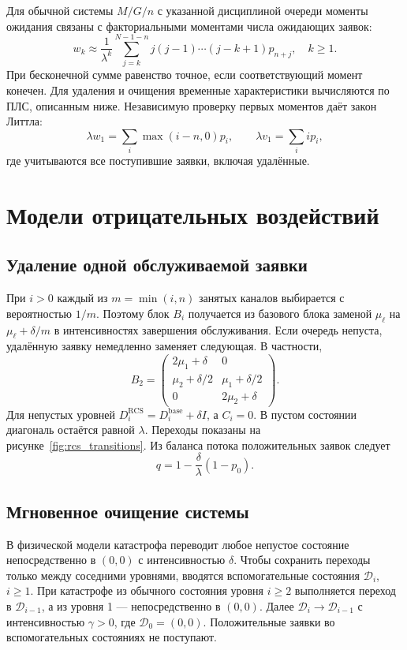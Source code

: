 Для обычной системы \(M/G/n\) с указанной дисциплиной очереди моменты ожидания связаны с факториальными моментами числа ожидающих заявок:
\[
w_k\approx\frac{1}{\lambda^k}\sum_{j=k}^{N-1-n}j(j-1)\cdots(j-k+1)p_{n+j},\quad k\ge1.
\]
При бесконечной сумме равенство точное, если соответствующий момент конечен. Для удаления и очищения временные характеристики вычисляются по ПЛС, описанным ниже. Независимую проверку первых моментов даёт закон Литтла:
\[
\lambda w_1=\sum_i\max(i-n,0)p_i,\qquad
\lambda v_1=\sum_i i p_i,
\]
где учитываются все поступившие заявки, включая удалённые.

\section{Модели отрицательных воздействий}
\subsection{Удаление одной обслуживаемой заявки}
При \(i>0\) каждый из \(m=\min(i,n)\) занятых каналов выбирается с вероятностью \(1/m\). Поэтому блок \(B_i\) получается из базового блока заменой \(\mu_\ell\) на \(\mu_\ell+\delta/m\) в интенсивностях завершения обслуживания. Если очередь непуста, удалённую заявку немедленно заменяет следующая. В частности,
\[
B_2=\begin{pmatrix}2\mu_1+\delta&0\\\mu_2+\delta/2&\mu_1+\delta/2\\0&2\mu_2+\delta\end{pmatrix}.
\]
Для непустых уровней \(D_i^{\mathrm{RCS}}=D_i^{\mathrm{base}}+\delta I\), а \(C_i=0\). В пустом состоянии диагональ остаётся равной \(\lambda\). Переходы показаны на рисунке~\ref{fig:rcs_transitions}. Из баланса потока положительных заявок следует
\[
q=1-\frac{\delta}{\lambda}(1-p_0).
\]

\subsection{Мгновенное очищение системы}
В физической модели катастрофа переводит любое непустое состояние непосредственно в \((0,0)\) с интенсивностью \(\delta\). Чтобы сохранить переходы только между соседними уровнями, вводятся вспомогательные состояния \(\mathcal{D}_i\), \(i\ge1\). При катастрофе из обычного состояния уровня \(i\ge2\) выполняется переход в \(\mathcal{D}_{i-1}\), а из уровня 1 --- непосредственно в \((0,0)\). Далее \(\mathcal{D}_i\to \mathcal{D}_{i-1}\) с интенсивностью \(\gamma>0\), где \(\mathcal{D}_0=(0,0)\). Положительные заявки во вспомогательных состояниях не поступают.

